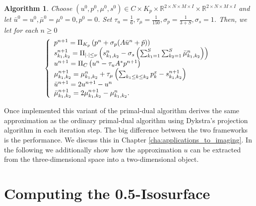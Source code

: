 \documentclass[abstracton]{scrreprt}
\newtheorem{algorithm}[theorem]{Algorithm}
\begin{document}
            \begin{algorithm}
                \label{alg:mumford_shah_lagrange_multiplier}
                Choose $(u^{0}, p^{0}, \mu^{0}, s^{0}) \in C \times K_{p} \times \mathbb{R}^{2 \times N \times M \times I} \times \mathbb{R}^{2 \times N \times M \times I}$ and let $\bar{u}^{0} = u^{0}, \bar{\mu}^{0} = \mu^{0} = 0, p^{0} = 0$. Set $\tau_{u} = \frac{1}{6}, \tau_{\mu} = \frac{1}{150}, \sigma_{p} = \frac{1}{3 + S}, \sigma_{s} = 1$. Then, we let for each $n \ge 0$
                    \begin{equation}
                        \left\{ 
                            \begin{array}{l l}
                              p^{n+1} = \Pi_{K_{p}} \left(p^{n} + \sigma_{p} (A \bar{u}^{n} + \tilde{p})\right) \\
                              s_{k_{1}, k_{2}}^{n+1} = \Pi_{|\cdot| \le \nu} \left(s_{k_{1}, k_{2}}^{n} - \sigma_{s} \left( \sum_{k_{1} = 1}^{S} \sum_{k_{2} = 1}^{S} \bar{\mu}_{k_{1}, k_{2}}^{n} \right) \right) \\
                              u^{n+1} = \Pi_{C} \left(u^{n} - \tau_{u} A^{*} p^{n+1} \right) \\
                              \mu_{k_{1}, k_{2}}^{n+1} = \mu_{k_{1}, k_{2}}^{n} + \tau_{\mu} \left( \sum_{k_{1} \le k \le k_{2}} p^{x}_{k} - s_{k_{1}, k_{2}}^{n+1} \right) \\
                              \bar{u}^{n+1} = 2u^{n+1} - u^{n} \\
                              \bar{\mu}_{k_{1}, k_{2}}^{n+1} = 2\mu_{k_{1}, k_{2}}^{n+1} - \mu_{k_{1}, k_{2}}^{n}.
                            \end{array}
                        \right.
                    \end{equation}
            \end{algorithm}
        Once implemented this variant of the primal-dual algorithm derives the same approximation as the ordinary primal-dual algorithm using Dykstra's projection algorithm in each iteration step. The big difference between the two frameworks is the performance. We discuss this in Chapter \ref{cha:applications_to_imaging}. In the following we additionally show how the approximation $u$ can be extracted from the three-dimensional space into a two-dimensional object.
    \section{Computing the 0.5-Isosurface} %
    \label{sec:computing_the_0_5_isosurface}
\end{document}
